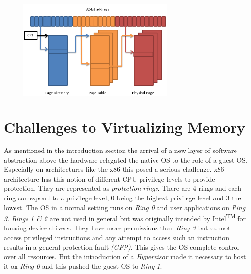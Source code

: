 \begin{figure}[tbp]
  \begin{center}
    \includegraphics[width=0.7\textwidth]{pagetable}
    \label{fig:fig1}
     \end{center}
\end{figure}

\section{Challenges to Virtualizing Memory}
As mentioned in the introduction section the arrival of a new layer of software abstraction above the hardware relegated the native OS to the role of a guest OS. Especially on architectures like the x86 this posed a serious challenge. x86 architecture has this notion of different CPU privilege levels to provide protection. They are represented as \textit{protection rings}. There are 4 rings and each ring correspond to a privilege level, 0 being the highest privilege level and 3 the lowest. The OS in a normal setting runs on \textit{Ring 0} and user applications on \textit{Ring 3}. \textit{Rings 1 \& 2} are not used in general but was originally intended by Intel\textsuperscript{TM} for housing device drivers. They have more permissions than \textit{Ring 3} but cannot access privileged instructions and any attempt to access such an instruction results in a general protection fault \textit{(GFP)}\citep{wiki1}. This gives the OS complete control over all resources. But the introduction of a \textit{Hypervisor} made it necessary to host it on \textit{Ring 0} and this pushed the guest OS to \textit{Ring 1}.    

